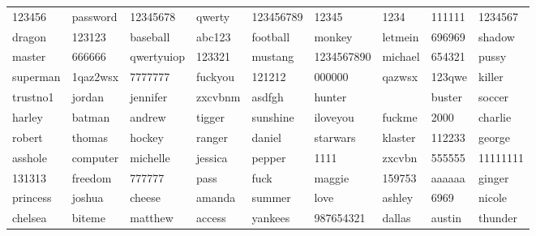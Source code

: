 \documentclass{tufte-handout}
\begin{document}
\begin{tabular}{lllllllll}

123456 & password & 12345678 & qwerty & 123456789 & 12345 & 1234 & 111111 & 1234567 \\
dragon & 123123 & baseball & abc123 & football & monkey & letmein & 696969 & shadow \\
master & 666666 & qwertyuiop & 123321 & mustang & 1234567890 & michael & 654321 & pussy \\
superman & 1qaz2wsx & 7777777 & fuckyou & 121212 & 000000 & qazwsx & 123qwe & killer \\
trustno1 & jordan & jennifer & zxcvbnm & asdfgh & hunter &  & buster & soccer \\
harley & batman & andrew & tigger & sunshine & iloveyou & fuckme & 2000 & charlie \\
robert & thomas & hockey & ranger & daniel & starwars & klaster & 112233 & george \\
asshole & computer & michelle & jessica & pepper & 1111 & zxcvbn & 555555 & 11111111 \\
131313 & freedom & 777777 & pass & fuck & maggie & 159753 & aaaaaa & ginger \\
princess & joshua & cheese & amanda & summer & love & ashley & 6969 & nicole \\
chelsea & biteme & matthew & access & yankees & 987654321 & dallas & austin & thunder \\
\end{tabular}
\end{document}

